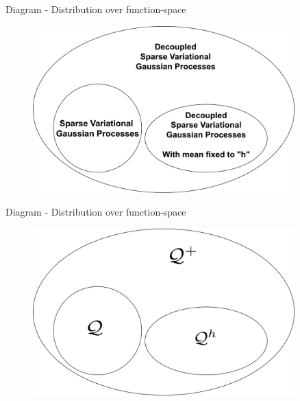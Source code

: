 \documentclass[aspectratio=149]{beamer}
\begin{document}
    \begin{frame}{Diagram - Distribution over function-space}
        \begin{figure}[h]
        	\begin{center}\includegraphics[width=0.90\textwidth]{slides_imgs/diagram.pdf} 
        	\end{center}
        \end{figure}
    \end{frame}
    \begin{frame}{Diagram - Distribution over function-space}
        \begin{figure}[h]
        	\begin{center}\includegraphics[width=0.90\textwidth]{slides_imgs/diagram2.pdf} 
        	\end{center}
        \end{figure}
    \end{frame}
\end{document}
